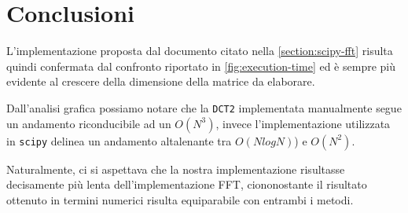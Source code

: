 \documentclass[11pt,italian]{article}
\begin{document}
\newpage
\section{Conclusioni}
L'implementazione proposta dal documento citato nella \cref{section:scipy-fft} risulta quindi confermata dal confronto riportato in \cref{fig:execution-time} ed è sempre più evidente al crescere della dimensione della matrice da elaborare.

Dall'analisi grafica possiamo notare che la \lstinline{DCT2} implementata manualmente segue un andamento riconducibile ad un $O(N^3)$, invece l'implementazione utilizzata in \lstinline{scipy} delinea un andamento altalenante tra $O(NlogN)$) e $O(N^2)$.

Naturalmente, ci si aspettava che la nostra implementazione risultasse decisamente più lenta dell'implementazione FFT, ciononostante il risultato ottenuto in termini numerici risulta equiparabile con entrambi i metodi.
\end{document}
